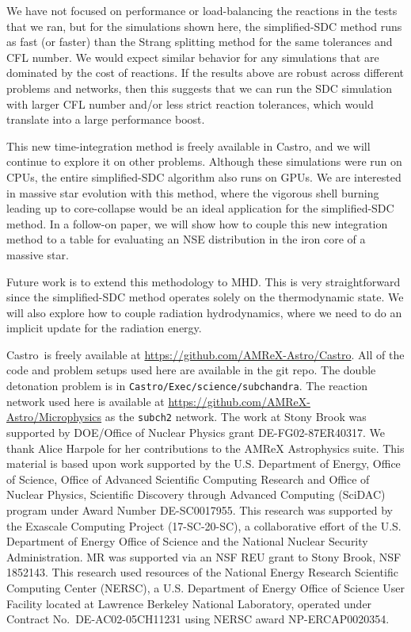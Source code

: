 \documentclass[linenumbers]{aastex631}
\newcommand{\castro}{{\sf Castro}}
\newcommand{\MarginPar}[1]{\marginpar{\vskip-\baselineskip\raggedright\tiny\sffamily\hrule\smallskip{\color{red}#1}\par\smallskip\hrule}}
\begin{document}
We have not focused on performance or load-balancing the reactions in
the tests that we ran, but for the simulations shown here,
the simplified-SDC method runs as fast (or faster) than the Strang splitting method
for the same tolerances and CFL number.
We would expect similar behavior for any simulations that are
dominated by the cost of reactions.  If the results above are robust across
different problems and networks, then this suggests that we can run
the SDC simulation with larger CFL number and/or less strict reaction tolerances,
which would translate into a large performance boost.

This new time-integration method is freely available in \castro, and
we will continue to explore it on other problems.  Although these simulations
were run on CPUs, the entire simplified-SDC algorithm also runs on GPUs.
We are interested in massive star evolution with this method, where the
vigorous shell burning leading up to core-collapse would be an ideal
application for the simplified-SDC method.  In a follow-on paper, we
will show how to couple this new integration method to a table for
evaluating an NSE distribution in the iron core of a massive star.

Future work is to extend this methodology to MHD.  This is very
straightforward since the simplified-SDC method operates solely on the
thermodynamic state.  We will also explore how to couple radiation
hydrodynamics, where we need to do an implicit update for the
radiation energy.


\begin{acknowledgments} 
\castro\ is freely available at
\url{https://github.com/AMReX-Astro/Castro}.  All of the code and problem setups
used here are available in the git repo.  The double detonation problem is in
{\tt Castro/Exec/science/subchandra}.  The reaction network used
here is available at \url{https://github.com/AMReX-Astro/Microphysics} as the {\tt subch2} network.  The work at Stony Brook was supported by
DOE/Office of Nuclear Physics grant DE-FG02-87ER40317.  We thank Alice Harpole
for her contributions to the AMReX Astrophysics suite.  This material is based
upon work supported by the U.S. Department of Energy, Office of Science, Office
of Advanced Scientific Computing Research and Office of Nuclear Physics,
Scientific Discovery through Advanced Computing (SciDAC) program under Award
Number DE-SC0017955.  This research was supported by the Exascale Computing
Project (17-SC-20-SC), a collaborative effort of the U.S. Department of Energy
Office of Science and the National Nuclear Security Administration.  MR was supported
via an NSF REU grant to Stony Brook, NSF 1852143.  This
research used resources of the National Energy Research Scientific Computing
Center (NERSC), a U.S. Department of Energy Office of Science User Facility
located at Lawrence Berkeley National Laboratory, operated under Contract No.\
DE-AC02-05CH11231 using NERSC award NP-ERCAP0020354.
\end{acknowledgments}
\end{document}

